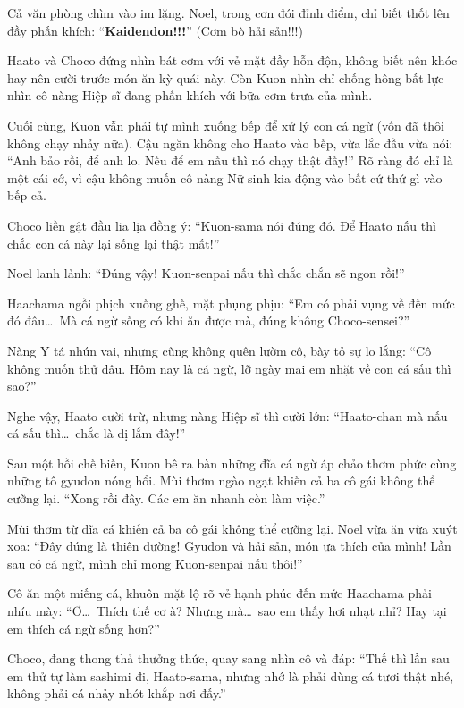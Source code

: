 \documentclass[../main.tex]{subfiles}
\begin{document}
Cả văn phòng chìm vào im lặng. Noel, trong cơn đói đỉnh điểm, chỉ biết thốt lên đầy phấn khích: ``\textbf{Kaidendon!!!}'' (Cơm bò hải sản!!!)


Haato và Choco đứng nhìn bát cơm với vẻ mặt đầy hỗn độn, không biết nên khóc hay nên cười trước món ăn kỳ quái này. Còn Kuon nhìn chỉ chống hông bất lực nhìn cô nàng Hiệp sĩ đang phấn khích với bữa cơm trưa của mình.

\omk

Cuối cùng, Kuon vẫn phải tự mình xuống bếp để xử lý con cá ngừ (vốn đã thôi không chạy nhảy nữa). Cậu ngăn không cho Haato vào bếp, vừa lắc đầu vừa nói: ``Anh bảo rồi, để anh lo. Nếu để em nấu thì nó chạy thật đấy!'' Rõ ràng đó chỉ là một cái cớ, vì cậu không muốn cô nàng Nữ sinh kia động vào bất cứ thứ gì vào bếp cả.

Choco liền gật đầu lia lịa đồng ý: ``Kuon-sama nói đúng đó. Để Haato nấu thì chắc con cá này lại sống lại thật mất!''

Noel lanh lảnh: ``Đúng vậy! Kuon-senpai nấu thì chắc chắn sẽ ngon rồi!''

Haachama ngồi phịch xuống ghế, mặt phụng phịu: ``Em có phải vụng về đến mức đó đâu\dots\ Mà cá ngừ sống có khi ăn được mà, đúng không Choco-sensei?''

Nàng Y tá nhún vai, nhưng cũng không quên lườm cô, bày tỏ sự lo lắng: ``Cô không muốn thử đâu. Hôm nay là cá ngừ, lỡ ngày mai em nhặt về con cá sấu thì sao?''

Nghe vậy, Haato cười trừ, nhưng nàng Hiệp sĩ thì cười lớn: ``Haato-chan mà nấu cá sấu thì\dots\ chắc là dị lắm đây!''

\ct

Sau một hồi chế biến, Kuon bê ra bàn những đĩa cá ngừ áp chảo thơm phức cùng những tô gyudon nóng hổi. Mùi thơm ngào ngạt khiến cả ba cô gái không thể cưỡng lại. ``Xong rồi đây. Các em ăn nhanh còn làm việc.''

Mùi thơm từ đĩa cá khiến cả ba cô gái không thể cưỡng lại.  Noel vừa ăn vừa xuýt xoa: ``Đây đúng là thiên đường! Gyudon và hải sản, món ưa thích của mình! Lần sau có cá ngừ, mình chỉ mong Kuon-senpai nấu thôi!''

Cô ăn một miếng cá, khuôn mặt lộ rõ vẻ hạnh phúc đến mức Haachama phải nhíu mày: ``Ơ\dots\ Thích thế cơ à? Nhưng mà\dots\ sao em thấy hơi nhạt nhỉ? Hay tại em thích cá ngừ sống hơn?''

Choco, đang thong thả thưởng thức, quay sang nhìn cô và đáp: ``Thế thì lần sau em thử tự làm sashimi đi, Haato-sama, nhưng nhớ là phải dùng cá tươi thật nhé, không phải cá nhảy nhót khắp nơi đấy.''
\end{document}
